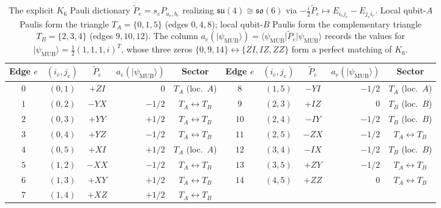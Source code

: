 \documentclass[11pt,a4paper]{article}
\theoremstyle{plain}
\theoremstyle{definition}
\theoremstyle{remark}
\newcommand{\ket}[1]{\lvert #1 \rangle}
\newcommand{\expval}[2]{\langle #1 \vert #2 \vert #1 \rangle}
\newcommand{\psimub}{\ket{\psi_{\mathrm{MUB}}}}
\begin{document}
\begin{table}[htbp]
  \centering
  \caption{The explicit $K_6$ Pauli dictionary $\tilde{P}_e = s_e P_{a_e, b_e}$ realizing $\mathfrak{su}(4) \cong \mathfrak{so}(6)$ via $-\frac{i}{2}\tilde{P}_e \mapsto E_{i_e j_e} - E_{j_e i_e}$. Local qubit-$A$ Paulis form the triangle $T_A = \{0,1,5\}$ (edges $0,4,8$); local qubit-$B$ Paulis form the complementary triangle $T_B = \{2,3,4\}$ (edges $9,10,12$). The column $a_e(\psimub) = \expval{\psi_{\mathrm{MUB}}}{\tilde{P}_e}$ records the values for $\psimub = \frac{1}{2}(1,1,1,i)^T$, whose three zeros $\{0, 9, 14\} \leftrightarrow \{ZI, IZ, ZZ\}$ form a perfect matching of $K_6$.}
  \label{tab:k6-dict}
  \footnotesize
  \setlength{\tabcolsep}{4.5pt}
  \begin{tabular}{@{}cccrc@{\qquad}cccrc@{}}
    \toprule
    Edge $e$ & $(i_e, j_e)$ & $\tilde{P}_e$ & $a_e(\psimub)$ & Sector &
    Edge $e$ & $(i_e, j_e)$ & $\tilde{P}_e$ & $a_e(\psimub)$ & Sector \\
    \midrule
    $0$  & $(0,1)$ & $+ZI$ & $0$     & $T_A$ (loc.\ $A$) &
    $8$  & $(1,5)$ & $-YI$ & $-1/2$  & $T_A$ (loc.\ $A$) \\
    $1$  & $(0,2)$ & $-YX$ & $-1/2$  & $T_A \leftrightarrow T_B$ &
    $9$  & $(2,3)$ & $+IZ$ & $0$     & $T_B$ (loc.\ $B$) \\
    $2$  & $(0,3)$ & $+YY$ & $+1/2$  & $T_A \leftrightarrow T_B$ &
    $10$ & $(2,4)$ & $-IY$ & $-1/2$  & $T_B$ (loc.\ $B$) \\
    $3$  & $(0,4)$ & $+YZ$ & $-1/2$  & $T_A \leftrightarrow T_B$ &
    $11$ & $(2,5)$ & $-ZX$ & $-1/2$  & $T_A \leftrightarrow T_B$ \\
    $4$  & $(0,5)$ & $+XI$ & $+1/2$  & $T_A$ (loc.\ $A$) &
    $12$ & $(3,4)$ & $-IX$ & $-1/2$  & $T_B$ (loc.\ $B$) \\
    $5$  & $(1,2)$ & $-XX$ & $-1/2$  & $T_A \leftrightarrow T_B$ &
    $13$ & $(3,5)$ & $+ZY$ & $-1/2$  & $T_A \leftrightarrow T_B$ \\
    $6$  & $(1,3)$ & $+XY$ & $+1/2$  & $T_A \leftrightarrow T_B$ &
    $14$ & $(4,5)$ & $+ZZ$ & $0$     & $T_A \leftrightarrow T_B$ \\
    $7$  & $(1,4)$ & $+XZ$ & $+1/2$  & $T_A \leftrightarrow T_B$ &
         &         &       &         & \\
    \bottomrule
  \end{tabular}
\end{table}
\end{document}
